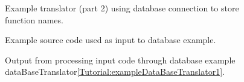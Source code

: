 \begin{figure}[!h]
{\indent
{\mySmallFontSize


\begin{latexonly}
   
\end{latexonly}

\begin{htmlonly}
   
\end{htmlonly}

}
}
\caption{Example translator (part 2) using database connection to store function names.}
\label{Tutorial:exampleDataBaseTranslator2}
\end{figure}

\begin{figure}[!h]
{\indent
{\mySmallFontSize


\begin{latexonly}
   
\end{latexonly}

\begin{htmlonly}
   
\end{htmlonly}

}
}
\caption{Example source code used as input to database example.}
\label{Tutorial:exampleDataBase1}
\end{figure}

\begin{figure}[!h]
{\indent
{\mySmallFontSize


\begin{latexonly}
   
\end{latexonly}

\begin{htmlonly}
   
\end{htmlonly}

}
}
\caption{Output from processing input code through database example
dataBaseTranslator\ref{Tutorial:exampleDataBaseTranslator1}.}
\label{Tutorial:exampleTemplate1Output}
\end{figure}


